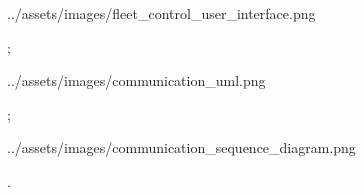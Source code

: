 
\centerline{\picw=16cm \inspic ../assets/images/fleet_control_user_interface.png }

\pg;


\centerline{\picw=16cm \inspic ../assets/images/communication_uml.png }

\pg;


\centerline{\picw=16cm \inspic ../assets/images/communication_sequence_diagram.png }

\pg.

